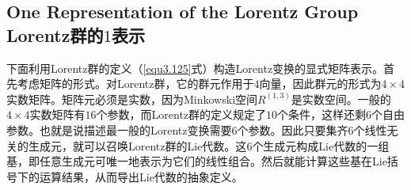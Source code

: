 \subsection[Lorentz群的$1$表示]{One Representation of the Lorentz Group \quad Lorentz群的$1$表示}
\label{sec3.7.1}
下面利用Lorentz群的定义（\eqref{equ3.125}式）构造Lorentz变换的显式矩阵表示。首先考虑矩阵的形式。对Lorentz群，它的群元作用于$4$向量，因此群元的形式为$4 \times 4$实数矩阵。矩阵元必须是实数，因为Minkowski空间$R^{(1, 3)}$是实数空间。一般的$4 \times 4$实数矩阵有$16$个参数，而Lorentz群的定义规定了$10$个条件，这样还剩$6$个自由参数。也就是说描述最一般的Lorentz变换需要$6$个参数。因此只要集齐$6$个线性无关的生成元，就可以召唤Lorentz群的Lie代数。这$6$个生成元构成Lie代数的一组基，即任意生成元可唯一地表示为它们的线性组合。然后就能计算这些基在Lie括号下的运算结果，从而导出Lie代数的抽象定义。

